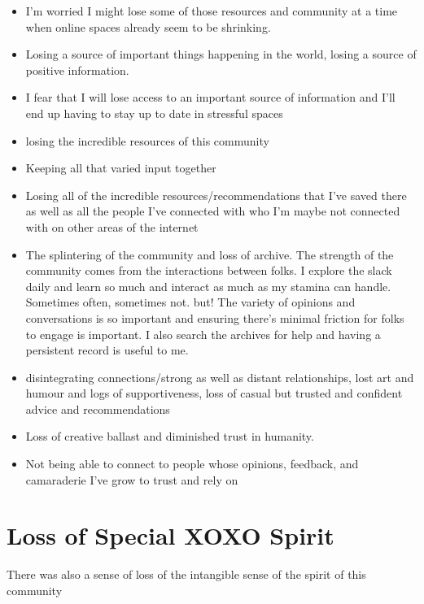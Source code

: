 \documentclass[
]{book}
\providecommand{\tightlist}{%
  \setlength{\itemsep}{0pt}\setlength{\parskip}{0pt}}
\begin{document}
\begin{itemize}
\tightlist
\item
  I'm worried I might lose some of those resources and community at a time when online spaces already seem to be shrinking.
\item
  Losing a source of important things happening in the world, losing a source of positive information.
\item
  I fear that I will lose access to an important source of information and I'll end up having to stay up to date in stressful spaces
\item
  losing the incredible resources of this community
\item
  Keeping all that varied input together
\item
  Losing all of the incredible resources/recommendations that I've saved there as well as all the people I've connected with who I'm maybe not connected with on other areas of the internet
\item
  The splintering of the community and loss of archive. The strength of the community comes from the interactions between folks. I explore the slack daily and learn so much and interact as much as my stamina can handle. Sometimes often, sometimes not. but! The variety of opinions and conversations is so important and ensuring there's minimal friction for folks to engage is important. I also search the archives for help and having a persistent record is useful to me.
\item
  disintegrating connections/strong as well as distant relationships, lost art and humour and logs of supportiveness, loss of casual but trusted and confident advice and recommendations
\item
  Loss of creative ballast and diminished trust in humanity.
\item
  Not being able to connect to people whose opinions, feedback, and camaraderie I've grow to trust and rely on
\end{itemize}

\section{Loss of Special XOXO Spirit}\label{loss-of-special-xoxo-spirit}

There was also a sense of loss of the intangible sense of the spirit of this community
\end{document}
